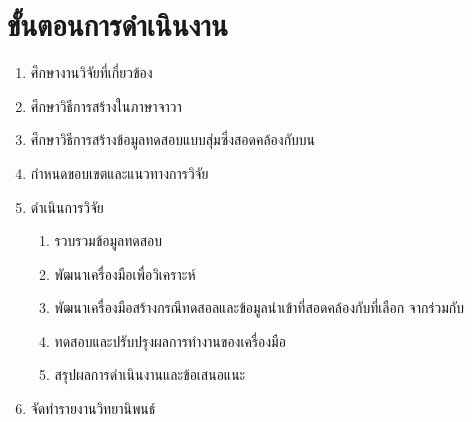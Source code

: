 \section{ขั้นตอนการดำเนินงาน}

\begin{enumerate}
    \item ศึกษางานวิจัยที่เกี่ยวข้อง
    \item ศึกษาวิธีการสร้าง{\scg}ในภาษาจาวา
    \item ศึกษาวิธีการสร้างข้อมูลทดสอบแบบสุ่มซึ่งสอดคล้องกับ{\PredicateNode}บน{\TestPath}
    \item กำหนดขอบเขตและแนวทางการวิจัย
    \item ดำเนินการวิจัย
    \begin{enumerate}
        \item รวบรวมข้อมูลทดสอบ
        \item พัฒนาเครื่องมือเพื่อวิเคราะห์{\scg}
        \item พัฒนาเครื่องมือสร้างกรณีทดสอลและข้อมูลนำเข้าที่สอดคล้องกับ{\TestPath}ที่เลือก จาก{\scg}ร่วมกับ{\cfg}
        \item ทดสอบและปรับปรุงผลการทำงานของเครื่องมือ
        \item สรุปผลการดำเนินงานและข้อเสนอแนะ
    \end{enumerate}
    \item จัดทำรายงานวิทยานิพนธ์
\end{enumerate}
